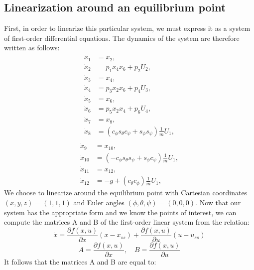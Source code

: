 \documentclass[a4paper,12pt]{article}
\begin{document}
\subsection{Linearization around an equilibrium point}
First, in order to linearize this particular system, we must express it as a system of first-order differential equations. The dynamics of the system are therefore written as follows:
\begin{align*}
\dot{x}_1 &= x_2, \\
\dot{x}_2 &= p_1 x_4 x_6 + p_2 U_2, \\
\dot{x}_3 &= x_4, \\
\dot{x}_4 &= p_3 x_2 x_6 + p_4 U_3, \\
\dot{x}_5 &= x_6, \\
\dot{x}_6 &= p_5 x_2 x_4 + p_6 U_4, \\
\dot{x}_7 &= x_8, \\
\dot{x}_8 &= \left( c_\phi s_\theta c_\psi + s_\phi s_\psi \right) \frac{1}{m} U_1, \\
\end{align*}
\begin{align*}
\dot{x}_9 &= x_{10}, \\
\dot{x}_{10} &= \left( -c_\phi s_\theta s_\psi + s_\phi c_\psi \right) \frac{1}{m} U_1, \\
\dot{x}_{11} &= x_{12}, \\
\dot{x}_{12} &= -g + \left( c_\theta c_\phi \right) \frac{1}{m} U_1,
\end{align*}
We choose to linearize around the equilibrium point with Cartesian coordinates $(x,y,z) = (1, 1, 1)$ and Euler angles $(\phi, \theta, \psi) = (0, 0, 0)$. Now that our system has the appropriate form and we know the points of interest, we can compute the matrices A and B of the first-order linear system from the relation:
\begin{equation}
    \dot{x} = \frac{\partial f(x,u)}{\partial x} (x - x_{ss}) + \frac{\partial f(x,u)}{\partial u} (u - u_{ss})
\end{equation}
\begin{equation}
    A = \frac{\partial f(x,u)}{\partial x},  \quad  B = \frac{\partial f(x,u)}{\partial u}
\end{equation}
It follows that the matrices A and B are equal to:
\setcounter{MaxMatrixCols}{12}
\end{document}
